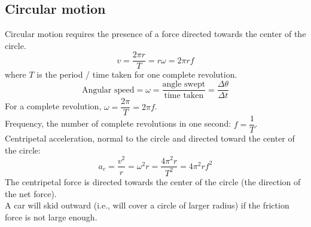 \subsection{Circular motion}
Circular motion requires the presence of a force directed towards the center of the circle.
\[v=\dfrac{2\pi r}{T}=r\omega=2\pi rf\]
where $T$ is the period / time taken for one complete revolution.\\
\[\text{Angular speed} = \omega =\dfrac{\text{angle swept}}{\text{time taken}}=\dfrac{\Delta\theta}{\Delta t}\]
For a complete revolution, $\omega=\dfrac{2\pi}{T}=2\pi f$.\\
Frequency, the number of complete revolutions in one second: $f=\dfrac{1}{T}$.\\
Centripetal acceleration, normal to the circle and directed toward the center of the circle:
\[a_c=\dfrac{v^2}{r}=\omega^2 r=\dfrac{4\pi ^2 r}{T^2}=4\pi^2rf^2\]
The centripetal force is directed towards the center of the circle (the direction of the net force). \\
A car will skid outward (i.e., will cover a circle of larger radius) if the friction force is not large enough.
